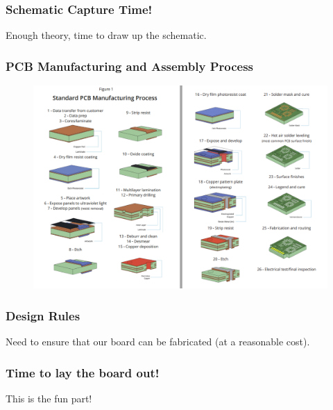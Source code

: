 \documentclass[t]{beamer}
\begin{document}

\begin{frame}
\frametitle{Schematic Capture Time!}
Enough theory, time to draw up the schematic.
\end{frame}



\begin{frame}
\frametitle{PCB Manufacturing and Assembly Process}

\begin{figure}
	\includegraphics[width = 0.9\linewidth]{pcbManufacture.png}
\end{figure}

\end{frame}


\begin{frame}
\frametitle{Design Rules}
Need to ensure that our board can be fabricated (at a reasonable cost).
\end{frame}


\begin{frame}
\frametitle{Time to lay the board out!}
This is the fun part!\\

\end{frame}

\end{document}
